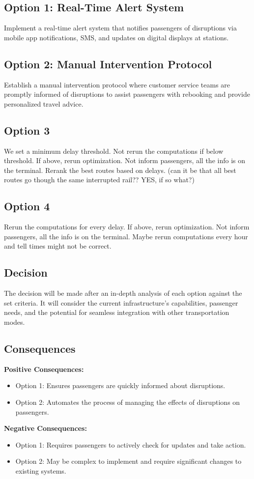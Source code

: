 \subsection*{Option 1: Real-Time Alert System}
Implement a real-time alert system that notifies passengers of disruptions via mobile app notifications, SMS, and updates on digital displays at stations.

\subsection*{Option 2: Manual Intervention Protocol}
Establish a manual intervention protocol where customer service teams are promptly informed of disruptions to assist passengers with rebooking and provide personalized travel advice.

\subsection*{Option 3}
We set a minimum delay threshold. Not rerun the computations if below threshold. If above, rerun optimization.
Not inform passengers, all the info is on the terminal.
Rerank the best routes based on delays. (can it be that all best routes go though the same interrupted rail?? YES, if so what?)
\subsection*{Option 4}
Rerun the computations for every delay. If above, rerun optimization.
Not inform passengers, all the info is on the terminal.
Maybe rerun computations every hour and tell times might not be correct.

\subsection*{Decision}
The decision will be made after an in-depth analysis of each option against the set criteria. It will consider the current infrastructure's capabilities, passenger needs, and the potential for seamless integration with other transportation modes.

\subsection*{Consequences}
\textbf{Positive Consequences:}
\begin{itemize}
    \item Option 1: Ensures passengers are quickly informed about disruptions.
    \item Option 2: Automates the process of managing the effects of disruptions on passengers.
\end{itemize}
\textbf{Negative Consequences:}
\begin{itemize}
    \item Option 1: Requires passengers to actively check for updates and take action.
    \item Option 2: May be complex to implement and require significant changes to existing systems.
\end{itemize}
